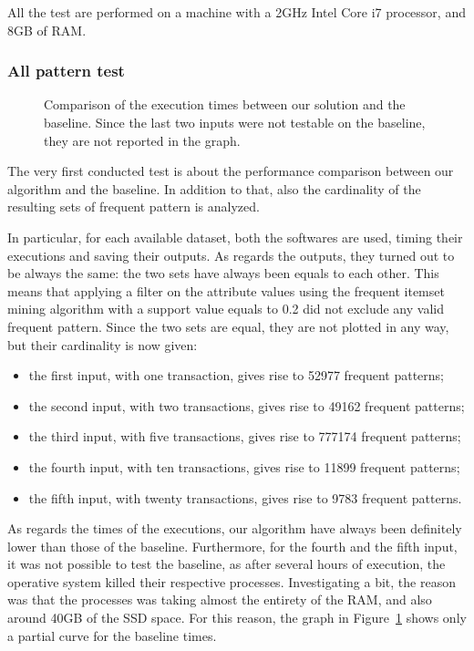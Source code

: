 \documentclass{acm_proc_article-sp-sigmod09}
\begin{document}
All the test are performed on a machine with a 2GHz Intel Core i7 processor, and 8GB of RAM.

\subsubsection{All pattern test}

\begin{figure}
\centering
{}
\caption{Comparison of the execution times between our solution and the baseline. Since the last two inputs were not testable on the baseline, they are not reported in the graph.}
\label{fig:testone}
\end{figure}

The very first conducted test is about the performance comparison between our algorithm and the baseline. In addition to that, also the cardinality of the resulting sets of frequent pattern is analyzed.

In particular, for each available dataset, both the softwares are used, timing their executions and saving their outputs. As regards the outputs, they turned out to be always the same: the two sets have always been equals to each other. This means that applying a filter on the attribute values using the frequent itemset mining algorithm with a support value equals to 0.2 did not exclude any valid frequent pattern. Since the two sets are equal, they are not plotted in any way, but their cardinality is now given:
\begin{itemize}
\item the first input, with one transaction, gives rise to 52977 frequent patterns;
\item the second input, with two transactions, gives rise to 49162 frequent patterns;
\item the third input, with five transactions, gives rise to 777174 frequent patterns;
\item the fourth input, with ten transactions, gives rise to 11899 frequent patterns;
\item the fifth input, with twenty transactions, gives rise to 9783 frequent patterns.
\end{itemize}

As regards the times of the executions, our algorithm have always been definitely lower than those of the baseline. Furthermore, for the fourth and the fifth input, it was not possible to test the baseline, as after several hours of execution, the operative system killed their respective processes. Investigating a bit, the reason was that the processes was taking almost the entirety of the RAM, and also around 40GB of the SSD space. For this reason, the graph in Figure~\ref{fig:testone} shows only a partial curve for the baseline times. 
\end{document}
